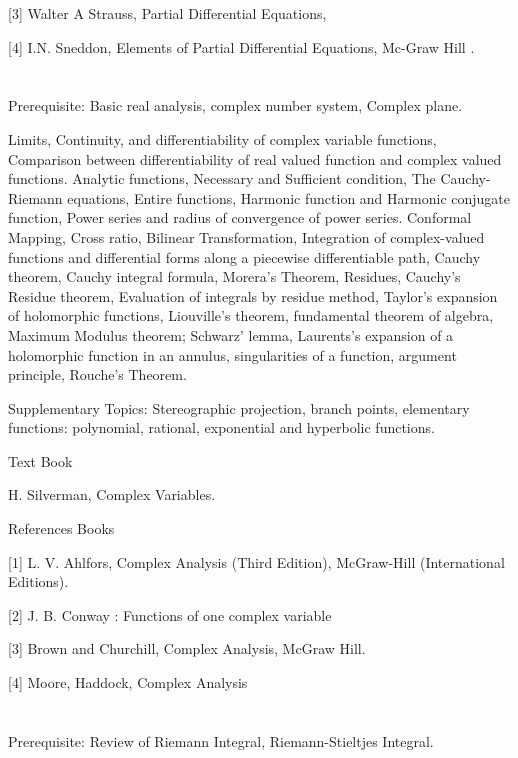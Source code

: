 [3] Walter A Strauss, Partial Differential Equations, 

[4] I.N. Sneddon, Elements of Partial Differential Equations, Mc-Graw Hill .

\section{\courseinfo}
Prerequisite: Basic real analysis, complex number system, Complex plane.  

Limits, Continuity, and differentiability of complex variable functions, Comparison between differentiability of real valued function and complex valued functions. Analytic functions, Necessary and Sufficient condition, The Cauchy-Riemann equations, Entire functions, Harmonic function and Harmonic conjugate function, Power series and radius of convergence of power series. Conformal Mapping, Cross ratio, Bilinear Transformation, Integration of complex-valued functions and differential forms along a piecewise differentiable path, Cauchy theorem, Cauchy integral formula, Morera’s Theorem, Residues, Cauchy’s Residue theorem, Evaluation of integrals by residue method, Taylor’s expansion of holomorphic functions, Liouville’s theorem, fundamental theorem of algebra, Maximum Modulus theorem; Schwarz’ lemma, Laurents’s expansion of a holomorphic function in an annulus, singularities of a function, argument principle, Rouche’s Theorem.

Supplementary Topics: Stereographic projection, branch points, elementary functions: polynomial, rational, exponential and hyperbolic functions.

Text Book

H. Silverman, Complex Variables.

References Books 

[1] L. V.  Ahlfors, Complex Analysis (Third Edition), McGraw-Hill (International Editions).

[2] J. B. Conway : Functions of one complex variable

[3] Brown and Churchill, Complex Analysis, McGraw Hill.

[4] Moore, Haddock, Complex Analysis

\section{\courseinfo}

Prerequisite: Review of Riemann Integral, Riemann-Stieltjes Integral.

